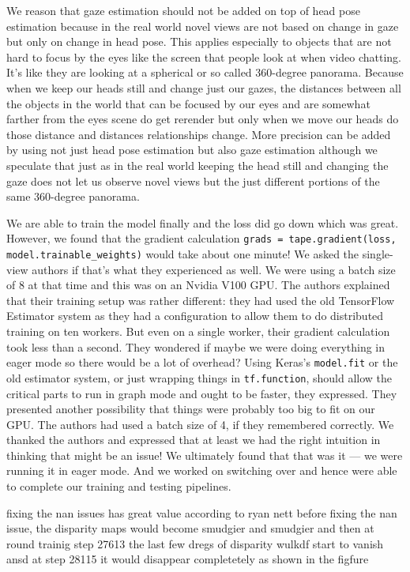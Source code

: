We reason that gaze estimation should not be added on top of head pose estimation because in the real world novel views are not based on change in gaze but only on change in head pose. This applies especially to objects that are not hard to focus by the eyes like the screen that people look at when video chatting. It's like they are looking at a spherical or so called 360-degree panorama. Because when we keep our heads still and change just our gazes, the distances between all the objects in the world that can be focused by our eyes and are somewhat farther from the eyes scene do get rerender but only when we move our heads do those distance and distances relationships change. More precision can be added by using not just head pose estimation but also gaze estimation although we speculate that just as in the real world keeping the head still and changing the gaze does not let us observe novel views but the just different portions of the same 360-degree panorama.


We are able to train the model finally and the loss did go down which was great. However, we found that the gradient calculation \texttt{grads = tape.gradient(loss, model.trainable\_weights)} would take about one minute! We asked the single-view authors if that's what they experienced as well. We were using a batch size of 8 at that time and this was on an Nvidia V100 GPU. The authors explained that their training setup was rather different: they had used the old TensorFlow Estimator system as they had a configuration to allow them to do distributed training on ten workers. But even on a single worker, their gradient calculation took less than a second. They wondered if maybe we were doing everything in eager mode so there would be a lot of overhead? Using Keras's \texttt{model.fit} or the old estimator system, or just wrapping things in \texttt{tf.function}, should allow the critical parts to run in graph mode and ought to be faster, they expressed. They presented another possibility that things were probably too big to fit on our GPU. The authors had used a batch size of 4, if they remembered correctly. We thanked the authors and expressed that at least we had the right intuition in thinking that might be an issue! We ultimately found that that was it --- we were running it in eager mode. And we worked on switching over and hence were able to complete our training and testing pipelines.

fixing the nan issues has great value according to ryan nett
before fixing the nan issue, the disparity maps would become smudgier and smudgier and then at round trainig step 27613 the last few dregs of disparity wulkdf start to vanish ansd at step 28115 it would disappear completetely as shown in the figfure


